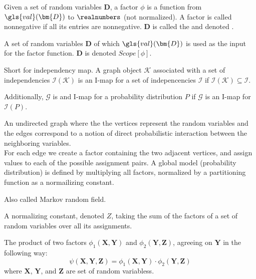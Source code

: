 

{%
  Given a \gls{set of random variables} $\bm{D}$, a factor $\phi$ is a function from $\gls{val}(\bm{D})$ to $\realnumbers$ (not normalized). A factor is called nonnegative if all its entries are nonnegative. $\bm{D}$ is called the  and denoted .
}

{%
  A \gls{set of random variables} $\bm{D}$ of which $\gls{val}(\bm{D})$ is used as the input for the \gls{factor} function. $\bm{D}$ is denoted $Scope[\phi]$.
}

{%
  Short for independency map. A graph object $\mathcal{K}$ associated with a \gls{set of independencies} $\mathcal{I}(\mathcal{K})$ is an I-map for a set of indepencencies $\mathcal{I}$ if $\mathcal{I}(\mathcal{K})\subseteq\mathcal{I}$.

  Additionally, $\mathcal{G}$ is and I-map for a \gls{probability distribution} $P$ if $\mathcal{G}$ is an I-map for $\mathcal{I}(P)$.

}

{%
  An undirected graph where the the vertices represent the \glspl{random variable} and the edges correspond to a notion of direct probabilistic interaction between the neighboring variables.\\

  For each edge we create a \gls{factor} containing the two adjacent vertices, and assign values to each of the possible assignment pairs. A global model (probability distribution) is defined by multiplying all factors, normalized by a \gls{partitioning function} as a normailizing constant.

  Also called Markov random field.

}

{%
  A normalizing constant, denoted $Z$, taking the sum of the \glspl{factor} of a \gls{set of random variables} over all its assignments.
}

{%
  The product of two \glspl{factor} $\phi_1(\bm{X},\bm{Y})$ and $\phi_2(\bm{Y},\bm{Z})$, agreeing on $\bm{Y}$ in the following way:
  \begin{equation*}
    \psi(\bm{X},\bm{Y},\bm{Z})=\phi_1(\bm{X},\bm{Y})\cdot\phi_2(\bm{Y},\bm{Z})
  \end{equation*}
  where $\bm{X}$, $\bm{Y}$, and $\bm{Z}$ are \glspl{set of random variables}.
}

